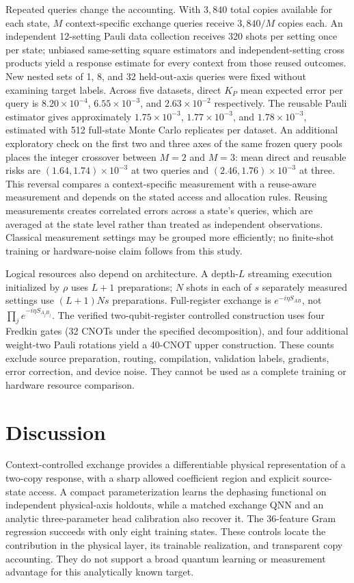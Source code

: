 \documentclass[pdflatex,sn-mathphys-num]{sn-jnl}
\begin{document}
Repeated queries change the accounting. With $3{,}840$ total copies available for each state, $M$ context-specific exchange queries receive $3{,}840/M$ copies each. An independent 12-setting Pauli data collection receives 320 shots per setting once per state; unbiased same-setting square estimators and independent-setting cross products yield a response estimate for every context from those reused outcomes. New nested sets of 1, 8, and 32 held-out-axis queries were fixed without examining target labels. Across five datasets, direct $K_P$ mean expected error per query is $8.20\times10^{-4}$, $6.55\times10^{-3}$, and $2.63\times10^{-2}$ respectively. The reusable Pauli estimator gives approximately $1.75\times10^{-3}$, $1.77\times10^{-3}$, and $1.78\times10^{-3}$, estimated with 512 full-state Monte Carlo replicates per dataset. An additional exploratory check on the first two and three axes of the same frozen query pools places the integer crossover between $M=2$ and $M=3$: mean direct and reusable risks are $(1.64,1.74)\times10^{-3}$ at two queries and $(2.46,1.76)\times10^{-3}$ at three. This reversal compares a context-specific measurement with a reuse-aware measurement and depends on the stated access and allocation rules. Reusing measurements creates correlated errors across a state's queries, which are averaged at the state level rather than treated as independent observations. Classical measurement settings may be grouped more efficiently; no finite-shot training or hardware-noise claim follows from this study.

Logical resources also depend on architecture. A depth-$L$ streaming execution initialized by $\rho$ uses $L+1$ preparations; $N$ shots in each of $s$ separately measured settings use $(L+1)Ns$ preparations. Full-register exchange is $e^{-i\eta S_{AB}}$, not $\prod_j e^{-i\eta S_{A_jB_j}}$. The verified two-qubit-register controlled construction uses four Fredkin gates (32 CNOTs under the specified decomposition), and four additional weight-two Pauli rotations yield a 40-CNOT upper construction. These counts exclude source preparation, routing, compilation, validation labels, gradients, error correction, and device noise. They cannot be used as a complete training or hardware resource comparison.

\section{Discussion}
Context-controlled exchange provides a differentiable physical representation of a two-copy response, with a sharp allowed coefficient region and explicit source-state access. A compact parameterization learns the dephasing functional on independent physical-axis holdouts, while a matched exchange QNN and an analytic three-parameter head calibration also recover it. The 36-feature Gram regression succeeds with only eight training states. These controls locate the contribution in the physical layer, its trainable realization, and transparent copy accounting. They do not support a broad quantum learning or measurement advantage for this analytically known target.
\end{document}
